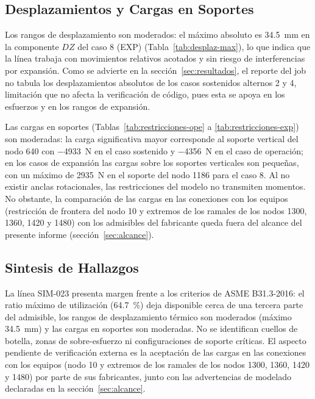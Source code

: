 \subsection{Desplazamientos y Cargas en Soportes}

Los rangos de desplazamiento son moderados: el m\'{a}ximo absoluto es
34.5~\si{mm} en la componente $DZ$ del caso 8 (EXP)
(Tabla~\ref{tab:desplaz-max}), lo que indica que la l\'{i}nea trabaja con
movimientos relativos acotados y sin riesgo de interferencias por expansi\'{o}n.
Como se advierte en la secci\'{o}n~\ref{sec:resultados}, el reporte del job no
tabula los desplazamientos absolutos de los casos sostenidos alternos 2 y 4,
limitaci\'{o}n que no afecta la verificaci\'{o}n de c\'{o}digo, pues esta se
apoya en los esfuerzos y en los rangos de expansi\'{o}n.

Las cargas en soportes (Tablas~\ref{tab:restricciones-ope} a
\ref{tab:restricciones-exp}) son moderadas: la carga significativa mayor
corresponde al soporte vertical del nodo 640 con \num{-4933}~\si{N} en el caso
sostenido y \num{-4356}~\si{N} en el caso de operaci\'{o}n; en los casos de
expansi\'{o}n las cargas sobre los soportes verticales son peque\~{n}as, con un
m\'{a}ximo de \num{2935}~\si{N} en el soporte del nodo 1186 para el caso 8. Al
no existir anclas rotacionales, las restricciones del modelo no transmiten
momentos. No obstante, la comparaci\'{o}n de las cargas en las conexiones con
los equipos (restricci\'{o}n de frontera del nodo 10 y extremos de los ramales
de los nodos 1300, 1360, 1420 y 1480) con los admisibles del fabricante queda
fuera del alcance del presente informe (secci\'{o}n~\ref{sec:alcance}).

\subsection{Sintesis de Hallazgos}

La l\'{i}nea SIM-023 presenta margen frente a los criterios de
ASME B31.3-2016: el ratio m\'{a}ximo de utilizaci\'{o}n (64.7~\%) deja
disponible cerca de una tercera parte del admisible, los rangos de
desplazamiento t\'{e}rmico son moderados (m\'{a}ximo 34.5~\si{mm}) y las cargas
en soportes son moderadas. No se identifican cuellos de botella, zonas de
sobre-esfuerzo ni configuraciones de soporte cr\'{i}ticas. El aspecto pendiente
de verificaci\'{o}n externa es la aceptaci\'{o}n de las cargas en las
conexiones con los equipos (nodo 10 y extremos de los ramales de los nodos
1300, 1360, 1420 y 1480) por parte de sus fabricantes, junto con las
advertencias de modelado declaradas en la secci\'{o}n~\ref{sec:alcance}.
